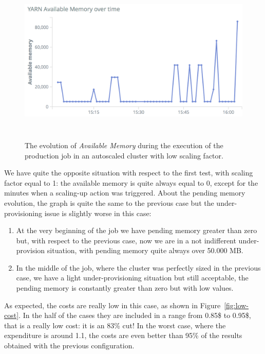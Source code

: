 \documentclass[12pt,twoside,cucitura]{toptesi}
\begin{document}
\begin{figure}
\centering
\includegraphics[height=80mm]{low-a-memory}
\caption{The evolution of \textit{Available Memory} during the execution of the production job in an autoscaled cluster with low scaling factor.}\label{fig:low-a-memory}
\end{figure}

We have quite the opposite situation with respect to the first test, with scaling factor equal to 1: the available memory is quite always equal to 0, except for the minutes when a scaling-up action was triggered. About the pending memory evolution, the graph is quite the same to the previous case but the under-provisioning issue is slightly worse in this case:
\begin{enumerate}
	\item At the very beginning of the job we have pending memory greater than zero but, with respect to the previous case, now we are in a not indifferent under-provision situation, with pending memory quite always over 50.000 MB.
	\item In the middle of the job, where the cluster was perfectly sized in the previous case, we have a light under-provisioning situation but still acceptable, the pending memory is constantly greater than zero but with low values.
\end{enumerate}

As expected, the costs are really low in this case, as shown in Figure~\ref{fig:low-cost}. In the half of the cases they are included in a range from 0.85\$ to 0.95\$, that is a really low cost: it is an 83\% cut! In the worst case, where the expenditure is around 1.1, the costs are even better than 95\% of the results obtained with the previous configuration.
\end{document}
